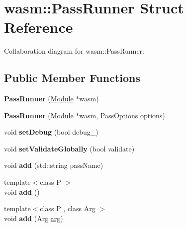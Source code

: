 \hypertarget{structwasm_1_1_pass_runner}{}\section{wasm\+:\+:Pass\+Runner Struct Reference}
\label{structwasm_1_1_pass_runner}


Collaboration diagram for wasm\+:\+:Pass\+Runner\+:
\subsection*{Public Member Functions}
\begin{DoxyCompactItemize}
\item 
\mbox{\label{structwasm_1_1_pass_runner_a8135b3c92565b86536b7f104bc79f860}} 
{\bfseries Pass\+Runner} (\mbox{\hyperlink{classwasm_1_1_module}{Module}} $\ast$wasm)
\item 
\mbox{\label{structwasm_1_1_pass_runner_a2496fbd2910911063abcd13ab03968ea}} 
{\bfseries Pass\+Runner} (\mbox{\hyperlink{classwasm_1_1_module}{Module}} $\ast$wasm, \mbox{\hyperlink{structwasm_1_1_pass_options}{Pass\+Options}} options)
\item 
\mbox{\label{structwasm_1_1_pass_runner_a05ab043e196761a96b422f8028f98e60}} 
void {\bfseries set\+Debug} (bool debug\+\_\+)
\item 
\mbox{\label{structwasm_1_1_pass_runner_aac28e5fe68f92844e77644344b0f80c9}} 
void {\bfseries set\+Validate\+Globally} (bool validate)
\item 
\mbox{\label{structwasm_1_1_pass_runner_aa50f193952a8d7d45ac9ae3d59103c53}} 
void {\bfseries add} (std\+::string pass\+Name)
\item 
\mbox{\label{structwasm_1_1_pass_runner_a5afda6d8cd04ec651c7af45d1d96e1c4}} 
{\footnotesize template$<$class P $>$ }\\void {\bfseries add} ()
\item 
\mbox{\label{structwasm_1_1_pass_runner_aefdf865c28c6cd6a9016d4559a1f08a2}} 
{\footnotesize template$<$class P , class Arg $>$ }\\void {\bfseries add} (Arg \mbox{\hyperlink{unionarg}{arg}})

\end{DoxyCompactItemize}
